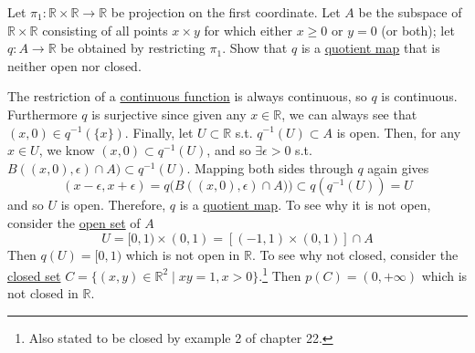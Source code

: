   \begin{exercise}[Munkres 22.3]
    Let $\pi_1 : \mathbb{R} \times \mathbb{R} \to \mathbb{R}$ be projection on the first coordinate. Let $A$ be the subspace of $\mathbb{R} \times \mathbb{R}$ consisting of all points $x \times y$ for which either $x \geq 0$ or $y = 0$ (or both); let $q : A \to \mathbb{R}$ be obtained by restricting $\pi_1$. Show that $q$ is a \hyperref[def:quotient-map]{quotient map} that is neither open nor closed.
  \end{exercise}
  \begin{solution} 
    The restriction of a \hyperref[def:continuous_func]{continuous function} is always continuous, so $q$ is continuous. Furthermore $q$ is surjective since given any $x \in \mathbb{R}$, we can always see that $(x, 0) \in q^{-1}(\{x\})$. Finally, let $U \subset \mathbb{R}$ s.t. $q^{-1} (U) \subset A$ is open. Then, for any $x \in U$, we know $(x, 0) \subset q^{-1} (U)$, and so  $\exists \epsilon > 0$ s.t. $B((x, 0), \epsilon) \cap A) \subset q^{-1} (U)$. Mapping both sides through $q$ again gives 
    \begin{equation}
      (x - \epsilon, x + \epsilon) = q\big( B((x, 0), \epsilon) \cap A) \big) \subset q (q^{-1}(U)) = U
    \end{equation}
    and so $U$ is open. Therefore, $q$ is a \hyperref[def:quotient-map]{quotient map}. To see why it is not open, consider the \hyperref[def:open-set]{open set} of $A$ 
    \begin{equation}
      U = [0, 1) \times (0, 1) = [(-1, 1) \times (0, 1)] \cap A 
    \end{equation} 
    Then $q(U) = [0, 1)$ which is not open in $\mathbb{R}$. To see why not closed, consider the \hyperref[def:closed]{closed set} $C = \{(x, y) \in \mathbb{R}^2 \mid xy = 1, x > 0 \}$.\footnote{Also stated to be closed by example 2 of chapter 22.} Then $p(C) = (0, +\infty)$ which is not closed in $\mathbb{R}$. 
  \end{solution}


